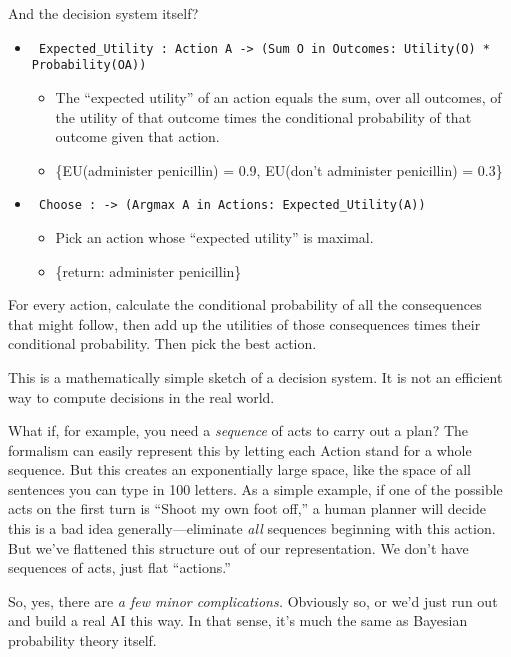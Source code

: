  And the decision system itself?

\begin{itemize}
\item \texttt{ Expected\_Utility : Action A -{\textgreater}\newline
  (Sum O in Outcomes: Utility(O) * Probability(O{\textbar}A))}
  \begin{itemize}
    \item  The ``expected utility'' of an action
equals the sum, over all outcomes, of the utility of that outcome times
the conditional probability of that outcome given that action.
\item \{EU(administer penicillin) = 0.9,
EU(don't administer penicillin) =
0.3\}
  \end{itemize}

\item \texttt{ Choose :\newline
  -{\textgreater} (Argmax A in Actions: Expected\_Utility(A))}
  \begin{itemize}
  \item  Pick an action whose ``expected utility'' is maximal.
  \item \{return: administer penicillin\}
  \end{itemize}
\end{itemize}


 For every action, calculate the conditional probability of all the
consequences that might follow, then add up the utilities of those
consequences times their conditional probability. Then pick the best
action.


 This is a mathematically simple sketch of a decision system. It is
not an efficient way to compute decisions in the real world.


 What if, for example, you need a \textit{sequence} of acts to
carry out a plan? The formalism can easily represent this by letting
each Action stand for a whole sequence. But this creates an
exponentially large space, like the space of all sentences you can type
in 100 letters. As a simple example, if one of the possible acts on the
first turn is ``Shoot my own foot
off,'' a human planner will decide this is a bad idea
generally---eliminate \textit{all} sequences beginning with this
action. But we've flattened this structure out of our
representation. We don't have sequences of acts, just
flat ``actions.''


 So, yes, there are \textit{a few minor complications.} Obviously
so, or we'd just run out and build a real AI this way.
In that sense, it's much the same as Bayesian
probability theory itself.


